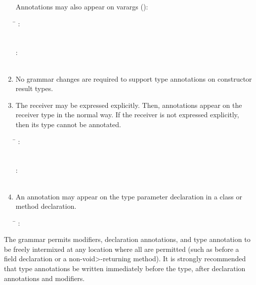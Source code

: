 \documentclass[10pt]{article}
\begin{document}
\begin{enumerate}
Annotations may also appear on varargs ():

\begin{tabbing}
\qquad \= \kill
{}: \\
\qquad       {}   \\
 \\
: \\
\qquad       {}  \\
\qquad        {}  
\end{tabbing}


\item
No grammar changes are required to support type annotations on constructor
result types.


\item
The receiver may be expressed explicitly.
Then, annotations appear on the receiver type in the normal way.
If the receiver is not expressed explicitly, then its type cannot be annotated.

\begin{tabbing}
\qquad \= \kill
{}: \\
\qquad        \term{(}  \term{)} \\
\\
: \\
\qquad        {}    \\
\qquad        {}
\end{tabbing}


\item
An annotation may appear on the type parameter
declaration in a class or method declaration.

\begin{tabbing}
\qquad \= \kill
{}: \\
\qquad            {}  
\end{tabbing}

\end{enumerate}


The grammar permits modifiers, declaration annotations, and type annotation
to be freely intermixed at any location where all are permitted (such as
before a field declaration or a non-\<void>-returning method).  It is
strongly recommended that type annotations be written immediately before
the type, after declaration annotations and modifiers.
\end{document}
